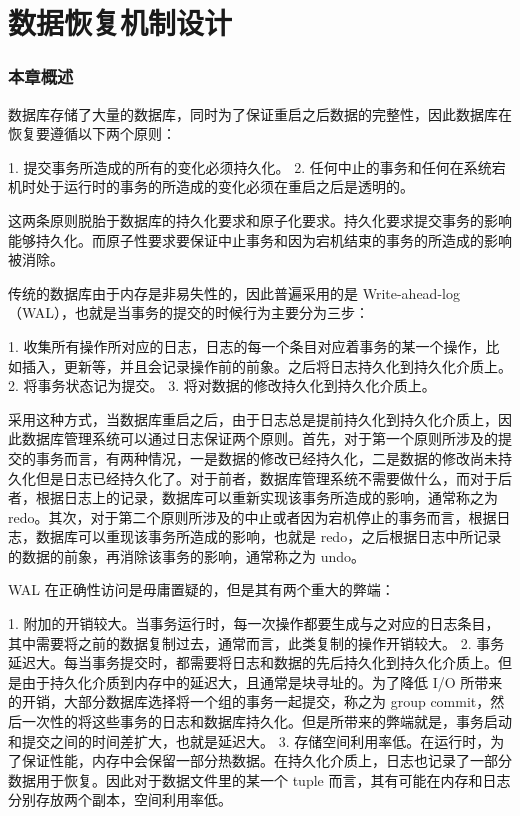 
\chapter{数据恢复机制设计}
\label{chap:recovery}

\subsection{本章概述}

数据库存储了大量的数据库，同时为了保证重启之后数据的完整性，因此数据库在恢复要遵循以下两个原则：

1. 提交事务所造成的所有的变化必须持久化。
2. 任何中止的事务和任何在系统宕机时处于运行时的事务的所造成的变化必须在重启之后是透明的。

这两条原则脱胎于数据库的持久化要求和原子化要求。持久化要求提交事务的影响能够持久化。而原子性要求要保证中止事务和因为宕机结束的事务的所造成的影响被消除。

传统的数据库由于内存是非易失性的，因此普遍采用的是 Write-ahead-log（WAL），也就是当事务的提交的时候行为主要分为三步：

1. 收集所有操作所对应的日志，日志的每一个条目对应着事务的某一个操作，比如插入，更新等，并且会记录操作前的前象。之后将日志持久化到持久化介质上。
2. 将事务状态记为提交。
3. 将对数据的修改持久化到持久化介质上。

采用这种方式，当数据库重启之后，由于日志总是提前持久化到持久化介质上，因此数据库管理系统可以通过日志保证两个原则。首先，对于第一个原则所涉及的提交的事务而言，有两种情况，一是数据的修改已经持久化，二是数据的修改尚未持久化但是日志已经持久化了。对于前者，数据库管理系统不需要做什么，而对于后者，根据日志上的记录，数据库可以重新实现该事务所造成的影响，通常称之为 redo。其次，对于第二个原则所涉及的中止或者因为宕机停止的事务而言，根据日志，数据库可以重现该事务所造成的影响，也就是 redo，之后根据日志中所记录的数据的前象，再消除该事务的影响，通常称之为 undo。

WAL 在正确性访问是毋庸置疑的，但是其有两个重大的弊端：

1. 附加的开销较大。当事务运行时，每一次操作都要生成与之对应的日志条目，其中需要将之前的数据复制过去，通常而言，此类复制的操作开销较大。
2. 事务延迟大。每当事务提交时，都需要将日志和数据的先后持久化到持久化介质上。但是由于持久化介质到内存中的延迟大，且通常是块寻址的。为了降低 I/O 所带来的开销，大部分数据库选择将一个组的事务一起提交，称之为 group commit，然后一次性的将这些事务的日志和数据库持久化。但是所带来的弊端就是，事务启动和提交之间的时间差扩大，也就是延迟大。
3. 存储空间利用率低。在运行时，为了保证性能，内存中会保留一部分热数据。在持久化介质上，日志也记录了一部分数据用于恢复。因此对于数据文件里的某一个 tuple 而言，其有可能在内存和日志分别存放两个副本，空间利用率低。

